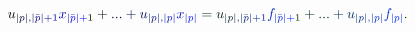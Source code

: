 \documentclass[12pt]{article}
\begin{document}
\makeatletter
\renewcommand*{\@textcolor}[3]{%
  \protect\leavevmode
  \begingroup
    \color#1{#2}#3%
  \endgroup
}
\makeatother
\begin{displaymath}
\mathcolor[RGB]{0,0,15}{u} _ { \mathcolor[RGB]{0,0,30}{|} \mathcolor[RGB]{0,0,45}{p} \mathcolor[RGB]{0,0,60}{|} \mathcolor[RGB]{0,0,75}{,} \mathcolor[RGB]{0,0,90}{|} \mathcolor[RGB]{0,0,105}{\bar { \mathcolor[RGB]{0,0,120}{p} } } \mathcolor[RGB]{0,0,135}{|} \mathcolor[RGB]{0,0,150}{+} \mathcolor[RGB]{0,0,165}{1} } \mathcolor[RGB]{0,0,180}{x} _ { \mathcolor[RGB]{0,0,195}{|} \mathcolor[RGB]{0,0,210}{\bar { \mathcolor[RGB]{0,0,225}{p} } } \mathcolor[RGB]{0,0,240}{|} \mathcolor[RGB]{0,0,255}{+} \mathcolor[RGB]{0,15,0}{1} } \mathcolor[RGB]{0,15,15}{+} \mathcolor[RGB]{0,15,30}{.} \mathcolor[RGB]{0,15,45}{.} \mathcolor[RGB]{0,15,60}{.} \mathcolor[RGB]{0,15,75}{+} \mathcolor[RGB]{0,15,90}{u} _ { \mathcolor[RGB]{0,15,105}{|} \mathcolor[RGB]{0,15,120}{p} \mathcolor[RGB]{0,15,135}{|} \mathcolor[RGB]{0,15,150}{,} \mathcolor[RGB]{0,15,165}{|} \mathcolor[RGB]{0,15,180}{p} \mathcolor[RGB]{0,15,195}{|} } \mathcolor[RGB]{0,15,210}{x} _ { \mathcolor[RGB]{0,15,225}{|} \mathcolor[RGB]{0,15,240}{p} \mathcolor[RGB]{0,15,255}{|} } \mathcolor[RGB]{0,30,0}{=} \mathcolor[RGB]{0,30,15}{u} _ { \mathcolor[RGB]{0,30,30}{|} \mathcolor[RGB]{0,30,45}{p} \mathcolor[RGB]{0,30,60}{|} \mathcolor[RGB]{0,30,75}{,} \mathcolor[RGB]{0,30,90}{|} \mathcolor[RGB]{0,30,105}{\bar { \mathcolor[RGB]{0,30,120}{p} } } \mathcolor[RGB]{0,30,135}{|} \mathcolor[RGB]{0,30,150}{+} \mathcolor[RGB]{0,30,165}{1} } \mathcolor[RGB]{0,30,180}{f} _ { \mathcolor[RGB]{0,30,195}{|} \mathcolor[RGB]{0,30,210}{\bar { \mathcolor[RGB]{0,30,225}{p} } } \mathcolor[RGB]{0,30,240}{|} \mathcolor[RGB]{0,30,255}{+} \mathcolor[RGB]{0,45,0}{1} } \mathcolor[RGB]{0,45,15}{+} \mathcolor[RGB]{0,45,30}{.} \mathcolor[RGB]{0,45,45}{.} \mathcolor[RGB]{0,45,60}{.} \mathcolor[RGB]{0,45,75}{+} \mathcolor[RGB]{0,45,90}{u} _ { \mathcolor[RGB]{0,45,105}{|} \mathcolor[RGB]{0,45,120}{p} \mathcolor[RGB]{0,45,135}{|} \mathcolor[RGB]{0,45,150}{,} \mathcolor[RGB]{0,45,165}{|} \mathcolor[RGB]{0,45,180}{p} \mathcolor[RGB]{0,45,195}{|} } \mathcolor[RGB]{0,45,210}{f} _ { \mathcolor[RGB]{0,45,225}{|} \mathcolor[RGB]{0,45,240}{p} \mathcolor[RGB]{0,45,255}{|} } \mathcolor[RGB]{0,60,0}{.}
\end{displaymath}
\end{document}
